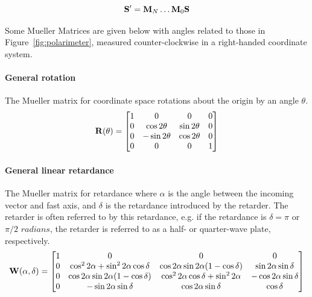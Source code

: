 \begin{equation}
    \mathbf{S}^{\prime} = \mathbf{M}_{N} \dots \mathbf{M}_{0} \mathbf{S}
    \label{eq:mueller_train}
\end{equation}

Some Mueller Matrices are given below with angles related to those in Figure~\ref{fig:polarimeter}, measured counter-clockwise in a right-handed coordinate system.

\paragraph*{General rotation}
The Mueller matrix for coordinate space rotations about the origin by an angle $\theta$.
\begin{equation}
    \mathbf{R}(\theta) =
    \begin{bmatrix}
        1 & 0              & 0             & 0 \\
        0 & \cos 2 \theta  & \sin 2 \theta & 0 \\
        0 & -\sin 2 \theta & \cos 2 \theta & 0 \\
        0 & 0              & 0             & 1 \\
    \end{bmatrix}
    \label{matrix:rotate}
\end{equation}

\paragraph*{General linear retardance}
The Mueller matrix for retardance where $\alpha$ is the angle between the incoming vector and fast axis, and $\delta$ is the retardance introduced by the retarder. The retarder is often referred to by this retardance, e.g. if the retardance is $\delta = \pi$ or $\pi / 2$ $radians$, the retarder is referred to as a half- or quarter-wave plate, respectively.
\begin{equation}
    \mathbf{W}(\alpha, \delta) =
    \begin{bmatrix}
        1 & 0                                                 & 0                                                 & 0                          \\
        0 & \cos^{2} 2 \alpha + \sin^{2} 2 \alpha \cos \delta & \cos 2 \alpha \sin 2 \alpha  (1 - \cos \delta)    & \sin 2 \alpha \sin \delta  \\
        0 & \cos 2 \alpha \sin 2 \alpha  (1 - \cos \delta)    & \cos^{2} 2 \alpha \cos \delta + \sin^{2} 2 \alpha & -\cos 2 \alpha \sin \delta \\
        0 & -\sin 2 \alpha \sin \delta                        & \cos 2 \alpha \sin \delta                         & \cos \delta                \\
    \end{bmatrix}
    \label{matrix:retarder}
\end{equation}

